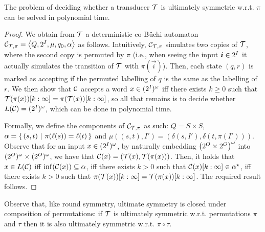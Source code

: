 \begin{theorem}
	The problem of deciding whether a transducer $\mathcal{T}$ is ultimately symmetric w.r.t.\! $\pi$ can be solved in polynomial time.
\end{theorem}
\begin{proof}
	We obtain from $\mathcal{T}$ a deterministic co-B\"uchi automaton $\mathcal{C}_{\mathcal{T},\pi}=\left< Q,2^{I},\mu,q_0,\alpha\right>$ as follows. Intuitively, $\mathcal{C}_{\mathcal{T},\pi}$ simulates two copies of $\mathcal{T}$, where the second copy is permuted by $\pi$ (i.e., when seeing the input $\boldsymbol{i}\in 2^{I}$ it actually simulates the transition of $\mathcal{T}$ with $\pi(\vec{i})$). Then, each state $(q,r)$ is marked as accepting if the permuted labelling of $q$ is the same as the labelling of $r$. 
	We then show that $\mathcal{C}$ accepts a word $x\in (2^{I})^\omega$ iff there exists $k\ge 0$ such that $\mathcal{T}(\pi(x))[k:\infty]=\pi(\mathcal{T}(x))[k:\infty]$, so all that remains is to decide whether $L(\mathcal{C})=(2^{I})^\omega$, which can be done in polynomial time.
	
	Formally, we define the components of $\mathcal{C}_{\mathcal{T}, \pi}$ as such: $Q=S\times S$, $\alpha=\left\{\,(s,t)\ \middle|\ \pi(\ell(s))=\ell(t)\,\right\}$ and $\mu\left((s,t),I'\right)=\left( \delta(s,I'), \delta(t, \pi(I')) \right)$. Observe that for an input $x\in (2^{I})^\omega$, by naturally embedding $\left(2^{O} \times 2^{O}\right)^\omega$ into $(2^{O})^\omega\times (2^{O})^\omega$, we have that $\mathcal{C}(x)=\left(\mathcal{T}(x), \mathcal{T}(\pi(x))\right)$.
	Then, it holds that $x\in L(\mathcal{C})$ iff $\inf(\mathcal{C}(x))\subseteq \alpha$, iff there exists $k>0$ such that $\mathcal{C}(x)[k:\infty]\in \alpha^\star$, iff there exists $k>0$ such that $\pi(\mathcal{T}(x))[k:\infty]=\mathcal{T}(\pi(x))[k:\infty]$. The required result follows.
\end{proof}

Observe that, like round symmetry, ultimate symmetry is closed under composition of permutations: if $\mathcal{T}$ is ultimately symmetric w.r.t.\! permutations $\pi$ and $\tau$ then it is also ultimately symmetric w.r.t.\! $\pi\circ\tau$.
